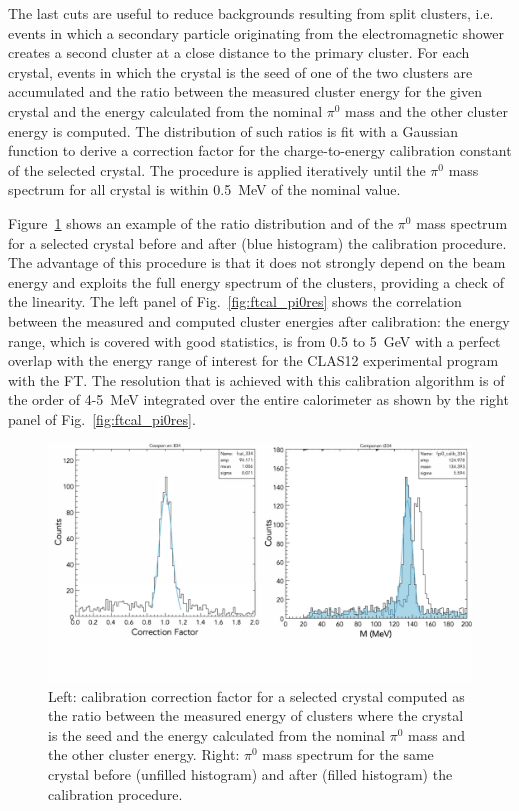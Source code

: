 The last cuts are useful to reduce backgrounds resulting from split clusters, i.e. events in which a secondary particle
originating from the electromagnetic shower creates a second cluster at a close distance to the primary cluster. For
each crystal, events in which the crystal is the seed of one of the two clusters are accumulated and the ratio between
the measured cluster energy for the given crystal and the energy calculated from the nominal $\pi^0$ mass and the
other cluster energy is computed. The distribution of such ratios is fit with a Gaussian function to derive a correction
factor for the charge-to-energy calibration constant of the selected crystal. The procedure is applied iteratively until
the $\pi^0$ mass spectrum for all crystal is within 0.5~MeV of the nominal value.

Figure~\ref{fig:ftcal_pi0} shows an example of the ratio distribution and of the $\pi^0$ mass spectrum for a selected
crystal before and after (blue histogram) the calibration procedure. The advantage of this procedure is that it does not
strongly depend on the beam energy and exploits the full energy spectrum of the clusters, providing a check of the
linearity. The left panel of Fig.~\ref{fig:ftcal_pi0res} shows the  correlation between the measured and computed cluster
energies after calibration: the energy range, which is covered with good statistics, is from 0.5 to 5~GeV with a perfect
overlap with the energy range of interest for the CLAS12 experimental program with the FT. The resolution that is
achieved with this calibration algorithm is of the order of 4-5~MeV integrated over the entire calorimeter as shown by
the right panel of Fig.~\ref{fig:ftcal_pi0res}.

\begin{figure}
\includegraphics[height=0.46\columnwidth]{fig/ftcal_pi0.pdf}
\caption{Left: calibration correction factor for a selected crystal computed as the ratio between the measured
  energy of clusters where the crystal is the seed and the energy calculated from the nominal $\pi^0$ mass and the
  other cluster energy. Right: $\pi^0$ mass spectrum for the same crystal before (unfilled histogram) and after (filled
  histogram) the calibration procedure.}
\label{fig:ftcal_pi0}
\end{figure}

